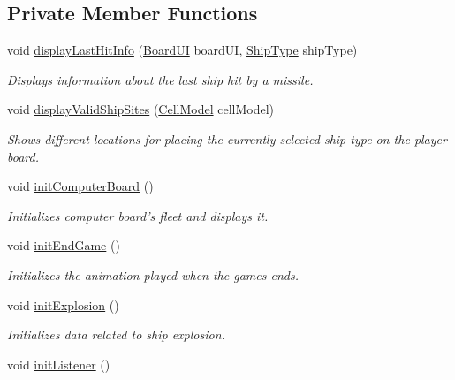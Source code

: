 \subsection*{Private Member Functions}
\begin{DoxyCompactItemize}
\item 
void \hyperlink{classbattleship2D_1_1ui_1_1MainFrame_a47173801e10e9ccf95e6ed8b8aedcab0}{display\-Last\-Hit\-Info} (\hyperlink{classbattleship2D_1_1ui_1_1BoardUI}{Board\-U\-I} board\-U\-I, \hyperlink{enumbattleship2D_1_1model_1_1ShipType}{Ship\-Type} ship\-Type)
\begin{DoxyCompactList}\small\item\em Displays information about the last ship hit by a missile. \end{DoxyCompactList}\item 
void \hyperlink{classbattleship2D_1_1ui_1_1MainFrame_a238468ca4d6ea2b0758224b11480c5f6}{display\-Valid\-Ship\-Sites} (\hyperlink{classbattleship2D_1_1model_1_1CellModel}{Cell\-Model} cell\-Model)
\begin{DoxyCompactList}\small\item\em Shows different locations for placing the currently selected ship type on the player board. \end{DoxyCompactList}\item 
void \hyperlink{classbattleship2D_1_1ui_1_1MainFrame_a9b6d961b3d374e50c855aca96100b132}{init\-Computer\-Board} ()
\begin{DoxyCompactList}\small\item\em Initializes computer board's fleet and displays it. \end{DoxyCompactList}\item 
void \hyperlink{classbattleship2D_1_1ui_1_1MainFrame_afc9fb5f26a83ffb126e6cc7c3594ad48}{init\-End\-Game} ()
\begin{DoxyCompactList}\small\item\em Initializes the animation played when the games ends. \end{DoxyCompactList}\item 
void \hyperlink{classbattleship2D_1_1ui_1_1MainFrame_aeda0b8f0f1838ca5ea399a477a938031}{init\-Explosion} ()
\begin{DoxyCompactList}\small\item\em Initializes data related to ship explosion. \end{DoxyCompactList}\item 
void \hyperlink{classbattleship2D_1_1ui_1_1MainFrame_a1cd0c4c8ac21dfa122e2424d19e9f53f}{init\-Listener} ()

\end{DoxyCompactItemize}
